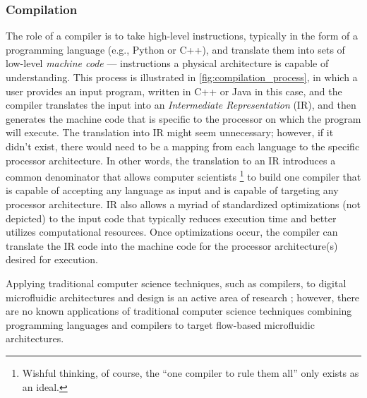 \subsubsection{Compilation}
\label{sec:compilation}
The role of a compiler is to take high-level instructions, typically in the form of a programming language (e.g., Python or C++), and translate them into sets of low-level \textit{machine code} --- instructions a physical architecture is capable of understanding.
This process is illustrated in \cref{fig:compilation_process}, 
in which a user provides an input program, written in C++ or Java in this case, and the compiler translates the input into an \textit{Intermediate Representation} (IR), and then generates the machine code that is specific to the processor on which the program will execute.
The translation into IR might seem unnecessary; however, if it didn't exist, there would need to be a mapping from each language to the specific processor architecture.
In other words, the translation to an IR introduces a common denominator that allows computer scientists
\footnote{Wishful thinking, of course, the ``one compiler to rule them all'' only exists as an ideal.}
to build one compiler that is capable of accepting any language as input and is capable of targeting any processor architecture.
IR also allows a myriad of standardized optimizations (not depicted) to the input code that typically reduces execution time and better utilizes computational resources.
Once optimizations occur, the compiler can translate the IR code into the machine code for the processor architecture(s) desired for execution.

Applying traditional computer science techniques, such as compilers, to digital microfluidic architectures and design is an active area of research \cite{curtis2018compiler,ott2018bioscript,grissom2015open}; however, there are no known applications of traditional computer science techniques combining programming languages and compilers to target flow-based microfluidic architectures.

